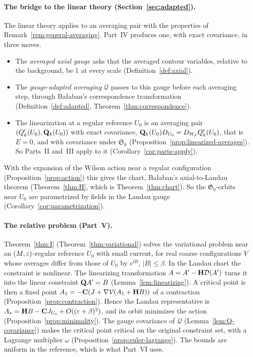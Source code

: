 \paragraph{The bridge to the linear theory (Section~\ref{sec:adapted}).} The linear theory applies to an averaging pair with the properties of Remark~\ref{rem:general-averaging}. Part~IV produces one, with exact covariance, in three moves.
\begin{itemize}
\item The \emph{averaged axial gauge} asks that the averaged contour variables, relative to the background, be $1$ at every scale (Definition~\ref{def:axial}).
\item The \emph{gauge-adapted averaging} $\mathcal Q$ passes to this gauge before each averaging step, through Ba\l aban's correspondence transformation (Definition~\ref{def:adapted}, Theorem~\ref{thm:correspondence}).
\item The linearization at a regular reference $U_0$ is an averaging pair $(Q'_k(U_0),\mathbf Q_k(U_0))$ with exact covariance, $\mathbf Q_k(U_0)D_{U_0}=D_{W_k}Q'_k(U_0)$, that is $E=0$, and with covariance under $\mathfrak S_k$ (Proposition~\ref{prop:linearized-averages}). So Parts~II and~III apply to it (Corollary~\ref{cor:parts-apply}).
\end{itemize}
With the expansion of the Wilson action near a regular configuration (Proposition~\ref{prop:action}) this gives the chart, Ba\l aban's axial-to-Landau theorem (Theorem~\ref{thm:H}, which is Theorem~\ref{thm:chart}). So the $\mathfrak G_0$-orbits near $U_0$ are parametrized by fields in the Landau gauge (Corollary~\ref{cor:parametrization}).

\paragraph{The relative problem (Part~V).} Theorem~\ref{thm:I} (Theorem~\ref{thm:variational}) solves the variational problem near an $(M,\varepsilon)$-regular reference $U_0$ with small current, for real coarse configurations $V$ whose averages differ from those of $U_0$ by $e^{\ii B}$, $|B|\le\beta$. In the Landau chart the constraint is nonlinear. The linearizing transformation $A=A'-\mathbf H\mathcal D(A')$ turns it into the linear constraint $\mathbf Q A'=B$ (Lemma~\ref{lem:linearizing}). A critical point is then a fixed point $A_1=-\mathbf C(J+\nabla\mathcal V(A_1+\mathbf H B))$ of a contraction (Proposition~\ref{prop:contraction}). Hence the Landau representative is $A_*=\mathbf H B-\mathbf C J_{U_0}+O((\varepsilon+\beta)^2)$, and its orbit minimizes the action (Proposition~\ref{prop:minimality}). The gauge covariance of $\mathcal Q$ (Lemma~\ref{lem:Q-covariance}) makes the critical point critical on the original constraint set, with a Lagrange multiplier $\omega$ (Proposition~\ref{prop:euler-lagrange}). The bounds are uniform in the reference, which is what Part~VI uses.

